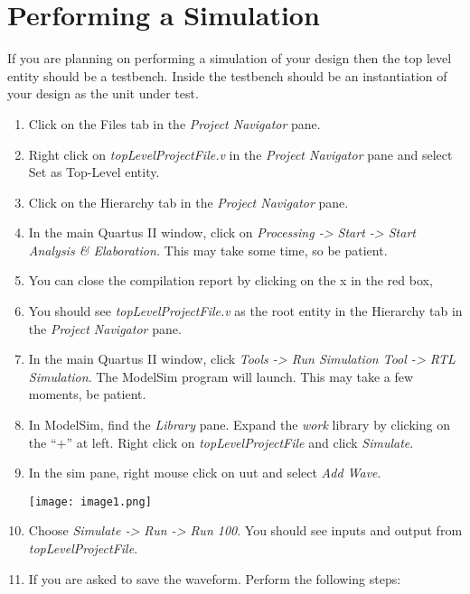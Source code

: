 \chapter{Performing a Simulation}
\graphicspath{ {./Lab00HowTo/howTo20 Performing Simulation/Fig} }

If you are planning on performing a simulation of your design then the
top level entity should be a testbench. Inside the testbench should be
an instantiation of your design as the unit under test.

\begin{enumerate}
        \def\labelenumi{\arabic{enumi}.}
    \item
        Click on the Files tab in the \emph{Project Navigator} pane.
    \item
        Right click on \emph{topLevelProjectFile.v} in the \emph{Project
        Navigator} pane and select Set as Top-Level entity.
    \item
        Click on the Hierarchy tab in the \emph{Project Navigator} pane.
    \item
        In the main Quartus II window, click on \emph{Processing
        -\textgreater{} Start -\textgreater{} Start Analysis \& Elaboration.}
        This may take some time, so be patient.
    \item
        You can close the compilation report by clicking on the x in the red
        box,
    \item
        You should see \emph{topLevelProjectFile.v} as the root entity in the
        Hierarchy tab in the \emph{Project Navigator} pane.
    \item
        In the main Quartus II window, click \emph{Tools -\textgreater{} Run
        Simulation Tool -\textgreater{} RTL Simulation}. The ModelSim program
        will launch. This may take a few moments, be patient.
    \item
        In ModelSim, find the \emph{Library} pane. Expand the \emph{work}
        library by clicking on the ``+'' at left. Right click on
        \emph{topLevelProjectFile} and click \emph{Simulate}.
    \item
        In the sim pane, right mouse click on uut and select \emph{Add Wave}.

        \texttt{[image: image1.png]}

    \item
        Choose \emph{Simulate -\textgreater{} Run -\textgreater{} Run 100}.
        You should see inputs and output from \emph{topLevelProjectFile}.
    \item
        If you are asked to save the waveform. Perform the following steps:


\end{enumerate}
